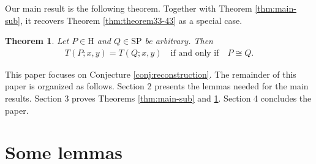 \documentclass[10pt,a4paper]{amsart}
\newtheorem{theorem}{Theorem}[section]
\newtheorem{remark}{Remark}[section]
\begin{document}
Our main result is the following theorem. Together with Theorem \ref{thm:main-sub}, it recovers
Theorem \ref{thm:theorem33-43} as a special case.


\begin{theorem}\label{thm:main}
Let $P\in\mathrm H$ and $Q\in\mathrm{SP}$ be arbitrary. Then
\begin{eqnarray*}
T(P;x,y)=T(Q;x,y)\quad\text{if and only if}\quad P\cong Q.
\end{eqnarray*}
\end{theorem}



This paper focuses on Conjecture \ref{conj:reconstruction}.
The remainder of this paper is organized as follows.
Section 2 presents the lemmas needed for the main results.
Section 3 proves Theorems \ref{thm:main-sub} and \ref{thm:main}.
Section 4 concludes the paper.


\section{Some lemmas}
\end{document}
